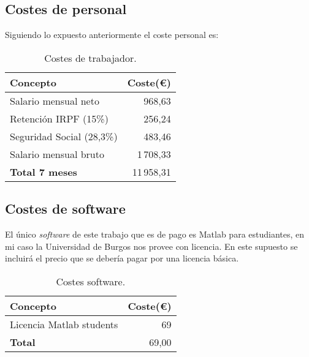\subsection{Costes de personal}
Siguiendo lo expuesto anteriormente el coste personal es:
\begin{table}[H]
		\centering
		\begin{tabular}[]{@{}l r@{}}
			\toprule
			\textbf{Concepto} & \textbf{Coste(\euro{})} \\
			\midrule
			Salario mensual neto & 968,63 \\
			Retención IRPF (15\%) & 256,24 \\
			Seguridad Social (28,3\%) & 483,46 \\
			Salario mensual bruto & 1\,708,33 \\
			\midrule
			\textbf{Total 7 meses} &  11\,958,31 \\
			\bottomrule
		\end{tabular}
		\caption{Costes de trabajador.}
		\label{tab:costes_trabajadorl}
	\end{table}

\subsection{Costes de software}

El único \emph{software} de este trabajo que es de pago es Matlab para estudiantes, en mi caso la Universidad de Burgos nos provee con licencia. En este supuesto se incluirá el precio que se debería pagar por una licencia básica. 
\begin{table}[H]
		\centering
		\begin{tabular}[]{@{}l r@{}}
			\toprule
			\textbf{Concepto} & \textbf{Coste(\euro{})} \\
			\midrule
			Licencia Matlab students & 69\\
			\midrule
			\textbf{Total } &  69,00 \\
			\bottomrule
		\end{tabular}
		\caption{Costes software.}
		\label{tab:costes_software}
	\end{table}


